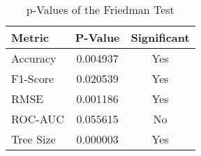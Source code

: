 
    \begin{table}[H]
        \centering
        \renewcommand{\arraystretch}{1.2}
        \caption{p-Values of the Friedman Test}
        \label{tab:comparison_test_friedman}
    \begin{tabular}{lcc}
\toprule
Metric & P-Value & Significant \\
\midrule
Accuracy & 0.004937 & Yes \\
F1-Score & 0.020539 & Yes \\
RMSE & 0.001186 & Yes \\
ROC-AUC & 0.055615 & No \\
Tree Size & 0.000003 & Yes \\
\bottomrule
\end{tabular}

        
    \end{table}
    